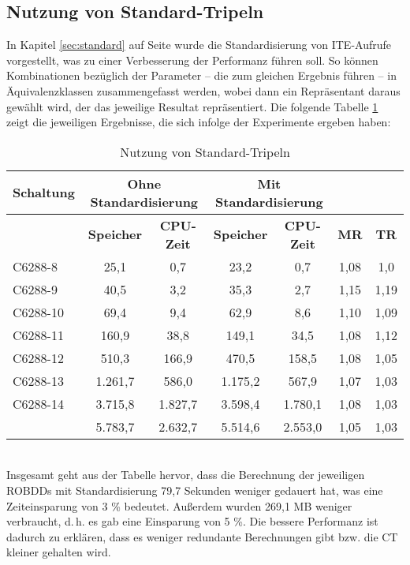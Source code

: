 \subsection{Nutzung von Standard-Tripeln}
\label{sec:sTripel}
In Kapitel \ref{sec:standard} auf Seite \pageref{sec:standard} wurde die Standardisierung von ITE-Aufrufe vorgestellt, was zu einer Verbesserung der Performanz führen soll. So können Kombinationen bezüglich der Parameter -- die zum gleichen Ergebnis führen -- in Äquivalenzklassen zusammengefasst werden, wobei dann ein Repräsentant daraus gewählt wird, der das jeweilige Resultat repräsentiert. Die folgende Tabelle \ref{tab:sTripel} zeigt die jeweiligen Ergebnisse, die sich infolge der Experimente ergeben haben:
\begin{table}[bth]
	\footnotesize
	\centering
	\caption{Nutzung von Standard-Tripeln}
	\label{tab:sTripel}
	\begin{tabular}{ | l | c | c | c | c | c | c |}
		\hline
		\multicolumn{1}{|c|}{\textbf{Schaltung}} & \multicolumn{2}{c|}{\textbf{Ohne Standardisierung}} & \multicolumn{2}{c|}{\textbf{Mit Standardisierung}} & \multicolumn{2}{c|}{~} \\ \hline
		~ & \multicolumn{1}{c|}{\textbf{Speicher}} & \multicolumn{1}{c|}{\textbf{CPU-Zeit}} & \multicolumn{1}{c|}{\textbf{Speicher}} & \multicolumn{1}{c|}{\textbf{CPU-Zeit}} & \multicolumn{1}{c|}{\textbf{MR}} & \multicolumn{1}{c|}{\textbf{TR}}\\ \hline
		C6288-8 & 25,1 & 0,7 & 23,2 & 0,7 & 1,08 & 1,0  \\ \hline
		C6288-9 & 40,5 & 3,2 & 35,3 & 2,7 & 1,15 & 1,19  \\ \hline
		C6288-10 & 69,4 & 9,4 & 62,9 & 8,6 & 1,10 & 1,09  \\ \hline
		C6288-11 & 160,9 & 38,8 & 149,1 & 34,5 & 1,08 & 1,12  \\ \hline
		C6288-12 & 510,3 & 166,9 & 470,5 & 158,5 & 1,08 & 1,05  \\ \hline
		C6288-13 & 1.261,7 & 586,0 & 1.175,2 & 567,9 & 1,07 & 1,03 \\ \hline
		C6288-14 & 3.715,8 & 1.827,7 & 3.598,4 & 1.780,1 & 1,08 & 1,03 \\ \hlineB{3}
		\multicolumn{1}{|c|}{\textbf{Gesamt}} & 5.783,7 & 2.632,7 & 5.514,6 & 2.553,0 & 1,05 & 1,03\\ \hline
	\end{tabular}
\end{table}\\
Insgesamt geht aus der Tabelle hervor, dass die Berechnung der jeweiligen ROBDDs mit Standardisierung 79,7 Sekunden weniger gedauert hat, was eine Zeiteinsparung von $3$ \% bedeutet. Außerdem wurden 269,1 MB weniger verbraucht, d.\,h. es gab eine Einsparung von 5 \%. Die bessere Performanz ist dadurch zu erklären, dass es weniger redundante Berechnungen gibt bzw. die CT kleiner gehalten wird.

